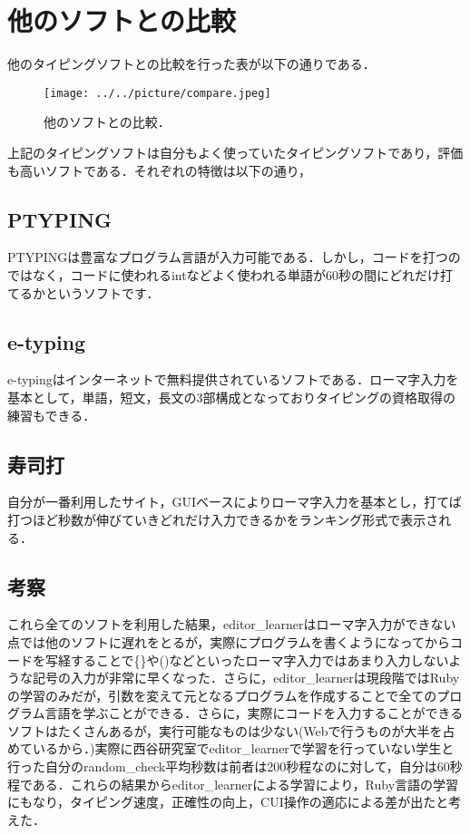 \chapter{他のソフトとの比較}\label{ux4ed6ux306eux30bdux30d5ux30c8ux3068ux306eux6bd4ux8f03}

    他のタイピングソフトとの比較を行った表が以下の通りである．

\begin{figure}[H]
\centering
\begin{center}
\texttt{[image: ../../picture/compare.jpeg]}
\end{center}
\caption{他のソフトとの比較．\label{compare}}

\label{fig:}
\end{figure}

上記のタイピングソフトは自分もよく使っていたタイピングソフトであり，評価も高いソフトである．それぞれの特徴は以下の通り，

\section{PTYPING}\label{ptyping}

PTYPINGは豊富なプログラム言語が入力可能である．しかし，コードを打つのではなく，コードに使われるintなどよく使われる単語が60秒の間にどれだけ打てるかというソフトです．

\section{e-typing}\label{e-typing}

e-typingはインターネットで無料提供されているソフトである．ローマ字入力を基本として，単語，短文，長文の3部構成となっておりタイピングの資格取得の練習もできる．

\section{寿司打}\label{ux5bffux53f8ux6253}

自分が一番利用したサイト，GUIベースによりローマ字入力を基本とし，打てば打つほど秒数が伸びていきどれだけ入力できるかをランキング形式で表示される．

\section{考察}\label{ux8003ux5bdf}

これら全てのソフトを利用した結果，editor\_learnerはローマ字入力ができない点では他のソフトに遅れをとるが，実際にプログラムを書くようになってからコードを写経することで\{\}や()などといったローマ字入力ではあまり入力しないような記号の入力が非常に早くなった．さらに，editor\_learnerは現段階ではRubyの学習のみだが，引数を変えて元となるプログラムを作成することで全てのプログラム言語を学ぶことができる．さらに，実際にコードを入力することができるソフトはたくさんあるが，実行可能なものは少ない(Webで行うものが大半を占めているから．)実際に西谷研究室でeditor\_learnerで学習を行っていない学生と行った自分のrandom\_check平均秒数は前者は200秒程なのに対して，自分は60秒程である．これらの結果からeditor\_learnerによる学習により，Ruby言語の学習にもなり，タイピング速度，正確性の向上，CUI操作の適応による差が出たと考えた．

    